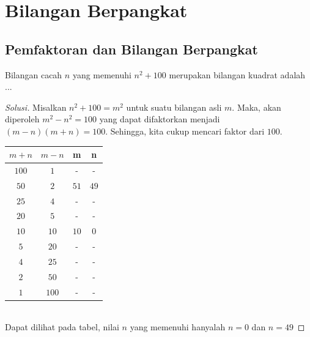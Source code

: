 \documentclass[11pt]{scrartcl}
\begin{document}

\section{Bilangan Berpangkat}
\subsection{Pemfaktoran dan Bilangan Berpangkat}
\begin{example}
    Bilangan cacah $n$ yang memenuhi $n^2 + 100$ merupakan bilangan kuadrat adalah ...
\end{example}

\begin{proof}[Solusi]
    Misalkan $n^2 + 100 = m^2$ untuk suatu bilangan asli $m$. Maka, akan diperoleh $m^2 - n^2 = 100$ yang dapat difaktorkan menjadi $(m - n)(m + n) = 100$. Sehingga, kita cukup mencari faktor dari $100$.
    \begin{table}[h!]
        \centering
        \begin{tabular}{c|c|c|c}
            \hline
            $m + n$ & $m - n$ & m & n  \\
            \hline 
            $100$ & $1$ & - & - \\
            $50$ & $2$ & $51$ & $49$ \\
            $25$ & $4$ & - & - \\
            $20$ & $5$ & - & - \\
            $10$ & $10$ & $10$ & $0$ \\
            $5$ & $20$ & - & - \\
            $4$ & $25$ & - & - \\
            $2$ & $50$ & - & - \\
            $1$ & $100$ & - & - \\
            \hline
        \end{tabular}
        \label{tab:my_label}
    \end{table}\\
    Dapat dilihat pada tabel, nilai $n$ yang memenuhi hanyalah $n = 0$ dan $n = 49$
\end{proof}
\end{document}

